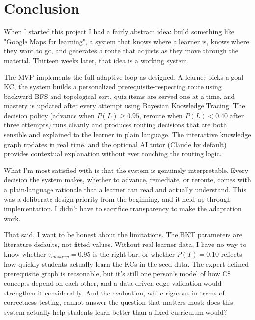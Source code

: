\documentclass{article}
\begin{document}
\FloatBarrier


\section{Conclusion}

When I started this project I had a fairly abstract idea: build something like "Google Maps for learning", a system that knows where a learner is, knows where they want to go, and generates a route that adjusts as they move through the material. Thirteen weeks later, that idea is a working system.

The MVP implements the full adaptive loop as designed. A learner picks a goal KC, the system builds a personalized prerequisite-respecting route using backward BFS and topological sort, quiz items are served one at a time, and mastery is updated after every attempt using Bayesian Knowledge Tracing. The decision policy (advance when $P(L) \ge 0.95$, reroute when $P(L) < 0.40$ after three attempts) runs cleanly and produces routing decisions that are both sensible and explained to the learner in plain language. The interactive knowledge graph updates in real time, and the optional AI tutor (Claude by default) provides contextual explanation without ever touching the routing logic.

What I'm most satisfied with is that the system is genuinely interpretable. Every decision the system makes, whether to advance, remediate, or reroute, comes with a plain-language rationale that a learner can read and actually understand. This was a deliberate design priority from the beginning, and it held up through implementation. I didn't have to sacrifice transparency to make the adaptation work.

That said, I want to be honest about the limitations. The BKT parameters are literature defaults, not fitted values. Without real learner data, I have no way to know whether $\tau_{mastery} = 0.95$ is the right bar, or whether $P(T) = 0.10$ reflects how quickly students actually learn the KCs in the seed data. The expert-defined prerequisite graph is reasonable, but it's still one person's model of how CS concepts depend on each other, and a data-driven edge validation would strengthen it considerably. And the evaluation, while rigorous in terms of correctness testing, cannot answer the question that matters most: does this system actually help students learn better than a fixed curriculum would?
\end{document}
